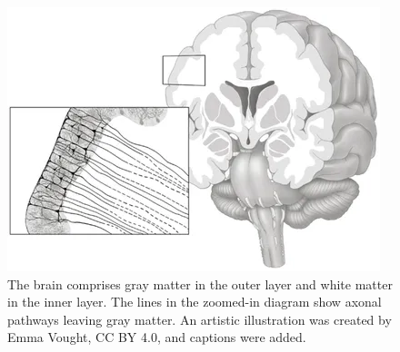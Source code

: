 
\begin{figure}
  \begin{center}
    \includegraphics[width=\textwidth]{images/manually_created/brain/brain_matter_illustration.png}
  \end{center}
  \caption[An artistic illustration of gray and white matter]{The brain comprises gray matter in the outer layer and white matter in the inner layer. The lines in the zoomed-in diagram show axonal pathways leaving gray matter. An artistic illustration was created by Emma Vought, CC BY 4.0, and captions were added. \cite{bonilha_gray_2015}}
  \label{fig:brain_matter_illustration}
\end{figure}


